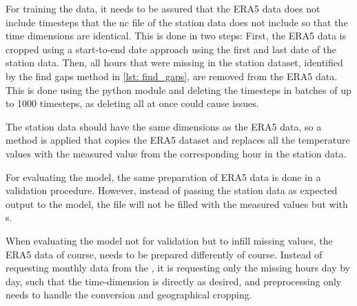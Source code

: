 For training the data, it needs to be assured that the ERA5 data does not include timesteps that the nc file of the station data does not include so that the time dimensions are identical.
This is done in two steps:
First, the ERA5 data is cropped using a start-to-end date approach using the first and last date of the station data.
Then, all hours that were missing in the station dataset, identified by the find gaps method in \autoref{lst: find_gaps}, are removed from the ERA5 data.
This is done using the python module  and deleting the timesteps in batches of up to 1000 timesteps, as deleting all at once could cause issues.

The station data should have the same dimensions as the ERA5 data, so a method is applied that copies the ERA5 dataset and replaces all the temperature values with the measured value from the corresponding hour in the station data.

For evaluating the model, the same preparation of ERA5 data is done in a validation procedure.
However, instead of passing the station data as expected output to the model, the file will not be filled with the measured values but with s.

When evaluating the model not for validation but to infill missing values, the ERA5 data of course, needs to be prepared differently of course.
Instead of requesting monthly data from the , it is requesting only the missing hours day by day, such that the time-dimension is directly as desired, and preprocessing only needs to handle the conversion and geographical cropping.

